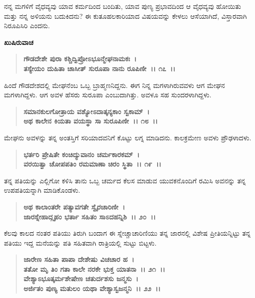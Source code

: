 ನನ್ನ ಮಗಳಿಗೆ ವೈಧವ್ಯವು ಯಾವ ಕರ್ಮದಿಂದ ಬಂದಿತು, ಯಾವ ಪುಣ್ಯ ಪ್ರಭಾವದಿಂದ ಆ ವೈಧವ್ಯವು ಹೋಯಿತು ಮತ್ತು ನನ್ನ ಅಳಿಯನು ಬದುಕಿದನು? ಈ ಕುತೂಹಲಕಾರಿಯಾದ ವಿಷಯವನ್ನು ಕೇಳಲು ಆಸೆಯಾಗಿದೆ, ವಿಸ್ತಾರವಾಗಿ ನಿರೂಪಿಸಿರಿ ಎಂದನು.

\newpage

\begin{flushleft}
\textbf{ಖುಷಿರುವಾಚ\enginline{-}}
\end{flushleft}

\begin{verse}
\textbf{ಗೌಡದೇಶೇ ಪುರಾ ಕಶ್ಚಿದ್ವಿಪ್ರೋಽಭೂನ್ಮೇಘನಾಮಕಃ~।}\\\textbf{ತಸ್ಯೇಯಂ ದುಹಿತಾ ಚಾಸೀತ್ ಸುರೂಪಾ ನಾನು ರೂಪಿಣೀ~।। ೧೭~।।}
\end{verse}

ಹಿಂದೆ ಗೌಡದೇಶದಲ್ಲಿ ಮೇಘನೆಂಬ ಒಬ್ಬ ಬ್ರಾಹ್ಮಣನಿದ್ದನು. ಈಗ ನಿನ್ನ ಮಗಳಾಗಿರುವವಳು ಆಗ ಮೇಘನ ಮಗಳಾಗಿದ್ದಳು. ಆಗ ಅವಳ ಹೆಸರು ಸುರೂಪಾ ಎಂಬುದಾಗಿತ್ತು. ಅವಳೂ ಸಹ ಸುಂದರಳಾಗಿದ್ದಳು.

\begin{verse}
\textbf{ಸಮಾನಕುಲಗೋತ್ರಾಯ ವಶ್ಯೋಽದಾತ್ಕನ್ಯಕಾಂ ಸ್ವಕಾಮ್~।}\\\textbf{ಅಥ ಕಾಲೇನ ಕಿಯತಾ ವಯಸ್ಥಾ ಸಾ ಸುರೂಪಿಣೀ~।। ೧೮~।।}
\end{verse}

ಮೇಘನು ಅವಳನ್ನು ತನ್ನ ಅಂತಸ್ತಿಗೆ ಸರಿಯಾದವನಿಗೆ ಕೊಟ್ಟು ಲಗ್ನ ಮಾಡಿದನು. ಕಾಲಕ್ರಮೇಣ ಅವಳು ಪ್ರೌಢಳಾದಳು.

\begin{verse}
\textbf{ಭರ್ತರಿ ಪ್ರೇಷಿತೇ ಕಂಚಿದ್ಯುವಾನಂ ಚರ್ಮಕಾರಕಮ್~।}\\\textbf{ವರಯಿತ್ವಾ ಚೋಪಪತಿಂ ರಮಮಾಣಾ ಚಿರಂ ಸ್ಥಿತಾ~।। ೧೯~।।}
\end{verse}

ತನ್ನ ಪತಿಯನ್ನು ಎಲ್ಲಿಗೋ ಕಳಿಸಿ ತಾನು ಒಬ್ಬ ಚರ್ಮದ ಕೆಲಸ ಮಾಡುವ ಯುವಕ\-ನೊಂದಿಗೆ ರಮಿಸಿ ಅವನನ್ನು ತನ್ನ ಉಪಪತಿಯನ್ನಾಗಿ ಮಾಡಿಕೊಂಡಳು.

\begin{verse}
\textbf{ಅಥ ಕಾಲಾಂತರೇ ಪತ್ಯಾವಗತೇ ಸ್ವೈರಚಾರಿಣೀ~।}\\\textbf{ಜಾರಸ್ನೇಹಾದ್ಗೃಹಂ ಭರ್ತಾ ಸಹಿತಂ ಸಾಽದಹನ್ನಿಶಿ~।। ೨೦~।।}
\end{verse}

ಕೆಲವು ಕಾಲದ ನಂತರ ಪತಿಯು ತಿರುಗಿ ಬಂದಾಗ ಈ ಸ್ನೇಚ್ಚಾಚಾರಿಣಿಯು ತನ್ನ ಜಾರನಲ್ಲಿ ವಿಶೇಷ ಪ್ರೀತಿಯನ್ನಿಟ್ಟು ತನ್ನ ಪತಿಯು ಇದ್ದ ಮನೆಯನ್ನು ಪತಿ ಸಹಿತವಾಗಿ ರಾತ್ರಿಯಲ್ಲಿ ಸುಟ್ಟು ಬಿಟ್ಟಳು.

\begin{verse}
\textbf{ಜಾರೇಣ ಸಹಿತಾ ಪಾಪಾ ದೇಶೇಷು ವಿಚಚಾರ ಹ~।}\\\textbf{ತತೋ ಮೃ ತಿಂ ಗತಾ ಕಾಲೇ ನರಕೇ ಭುಕ್ತ ಯಾತನಾ~।। ೨೧~।। }\\\textbf{ವೇಶ್ಯಾಽಭೂತ್ಕರ್ಮಶೇಷೇಣ ಚತುರ್ದಶಸು ಜನ್ಮಸು~।} \\\textbf{ಅರ್ಜಿತಂ ಪುಣ್ಯ ಮತುಲಂ ಯಥಾ ವೇಶ್ಯಾಸ್ವಜನ್ಮನಿ~।। ೨೨~।।}
\end{verse}

